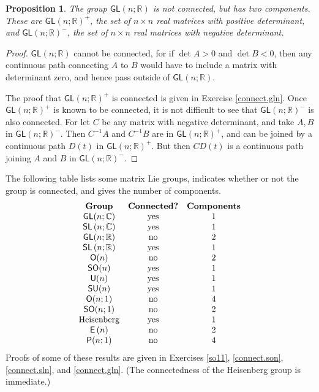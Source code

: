 \documentclass{amsbook}
\theoremstyle{plain}
\newtheorem{proposition}[theorem]{Proposition}
\numberwithin{equation}{chapter}
\numberwithin{theorem}{chapter}
\begin{document}
\begin{proposition}
The group $\mathsf{GL}(n;\mathbb{R})$ is not connected, but has two
components. These are $\mathsf{GL}(n;\mathbb{R})^{+}$, the set of $n\times n$
real matrices with positive determinant, and $\mathsf{GL}(n;\mathbb{R})^{-}$,
the set of $n\times n$ real matrices with negative determinant.
\end{proposition}

\begin{proof}
$\mathsf{GL}(n;\mathbb{R})$ cannot be connected, for if $\det A>0$ and $\det
B<0$, then any continuous path connecting $A$ to $B$ would have to include a
matrix with determinant zero, and hence pass outside of $\mathsf{GL}%
(n;\mathbb{R})$.

The proof that $\mathsf{GL}(n;\mathbb{R})^{+}$ is connected is given in
Exercise \ref{connect.gln}. Once $\mathsf{GL}(n;\mathbb{R})^{+}$ is known to
be connected, it is not difficult to see that $\mathsf{GL}(n;\mathbb{R})^{-}$
is also connected. For let $C$ be any matrix with negative determinant, and
take $A,B$ in $\mathsf{GL}(n;\mathbb{R})^{-}$. Then $C^{-1}A$ and $C^{-1}B$
are in $\mathsf{GL}(n;\mathbb{R})^{+}$, and can be joined by a continuous path
$D(t)$ in $\mathsf{GL}(n;\mathbb{R})^{+}$. But then $CD(t)$ is a continuous
path joining $A$ and $B$ in $\mathsf{GL}(n;\mathbb{R})^{-}$.
\end{proof}

The following table lists some matrix Lie groups, indicates whether or not the
group is connected, and gives the number of components.
\[%
\begin{array}
[c]{ccc}%
\text{\textbf{Group}} & \text{\textbf{Connected?}} & \text{\textbf{Components}%
}\\
\mathsf{GL}(n;\mathbb{C}) & \text{yes} & 1\\
\mathsf{SL}\left(  n;\mathbb{C}\right)  & \text{yes} & 1\\
\mathsf{GL}(n;\mathbb{R}) & \text{no} & 2\\
\mathsf{SL}\left(  n;\mathbb{R}\right)  & \text{yes} & 1\\
\mathsf{O}(n) & \text{no} & 2\\
\mathsf{SO}(n) & \text{yes} & 1\\
\mathsf{U}(n) & \text{yes} & 1\\
\mathsf{SU}(n) & \text{yes} & 1\\
\mathsf{O}(n;1) & \text{no} & 4\\
\mathsf{SO}(n;1) & \text{no} & 2\\
\text{Heisenberg} & \text{yes} & 1\\
\mathsf{E}\left(  n\right)  & \text{no} & 2\\
\mathsf{P}(n;1) & \text{no} & 4
\end{array}
\]
Proofs of some of these results are given in Exercises \ref{so11},
\ref{connect.son}, \ref{connect.sln}, and \ref{connect.gln}. (The
connectedness of the Heisenberg group is immediate.)
\end{document}
